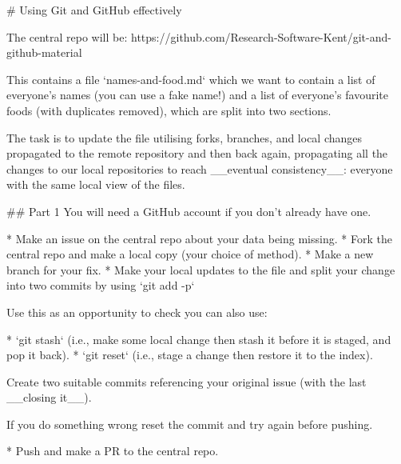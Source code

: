 # Using Git and GitHub effectively

The central repo will be: https://github.com/Research-Software-Kent/git-and-github-material

This contains a file `names-and-food.md` which we want to contain a list of everyone's names (you can use a fake name!) and a list of everyone's favourite foods (with duplicates removed), which are split into two sections.

The task is to update the file utilising forks, branches, and local changes propagated to the remote repository and then back again, propagating all the changes to our local repositories to reach __eventual consistency__: everyone with the same local view of the files.

## Part 1
You will need a GitHub account if you don't
already have one.

* Make an issue on the central repo about your data being missing.
* Fork the central repo and make a local copy (your choice of method).
* Make a new branch for your fix.
* Make your local updates to the file and split your change into two commits by using `git add -p`

Use this as an opportunity to check you can also use:

* `git stash` (i.e., make some local change then stash it
before it is staged, and pop it back).
* `git reset` (i.e., stage a change then restore it to the index).

Create two suitable commits referencing your original issue (with
the last __closing it__).

If you do something wrong reset the commit and try again before pushing.

* Push and make a PR to the central repo.
